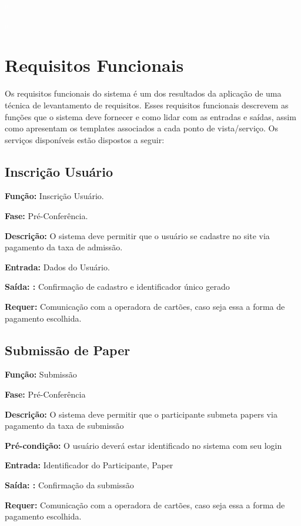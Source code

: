 \documentclass[letter]{article}
\begin{document}
\newpage
\textcolor{white}{a}
\newpage

\textcolor{white}{a}
\newpage
\section{Requisitos Funcionais}

Os requisitos funcionais do sistema é um dos resultados da aplicação de uma técnica de levantamento de requisitos. Esses requisitos funcionais descrevem as funções que o sistema deve fornecer e como lidar com as entradas e saídas, assim como apresentam os templates associados a cada ponto de vista/serviço. Os serviços disponíveis estão dispostos a seguir:

\subsection{Inscrição Usuário}

\textbf{Função:} Inscrição Usuário.

\textbf{Fase: } Pré-Conferência.

\textbf{Descrição: } O sistema deve permitir que o usuário se cadastre no site via pagamento da taxa de admissão.

\textbf{Entrada: } Dados do Usuário.

\textbf{Saída: :} Confirmação de cadastro e identificador único gerado

\textbf{Requer:} Comunicação com a operadora de cartões, caso seja essa a
forma de pagamento escolhida.



\subsection{ Submissão de Paper}

\textbf{Função:} Submissão

\textbf{Fase: } Pré-Conferência

\textbf{Descrição: } O sistema deve permitir que o participante submeta papers via pagamento da taxa de submissão

\textbf{Pré-condição: } O usuário deverá estar identificado no sistema com seu login

\textbf{Entrada: } Identificador do Participante, Paper

\textbf{Saída: :} Confirmação da submissão

\textbf{Requer:} Comunicação com a operadora de cartões, caso seja essa a forma de pagamento escolhida.
\end{document}
